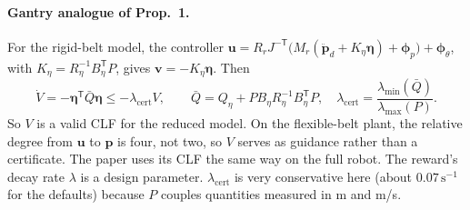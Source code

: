 \paragraph{Gantry analogue of Prop.~1.}
For the rigid-belt model, the controller
$\mathbf{u} = R_r J^{-\mathsf T}\bigl(M_r(\ddot{\mathbf{p}}_d + K_\eta \boldsymbol{\eta}) + \boldsymbol{\phi}_p\bigr) + \boldsymbol{\phi}_\theta$,
with $K_\eta = R_\eta^{-1} B_\eta^{\mathsf T} P$, gives $\mathbf{v} = -K_\eta \boldsymbol{\eta}$. Then
\begin{equation}
\dot V = -\boldsymbol{\eta}^{\mathsf T} \bar{Q} \boldsymbol{\eta}
\le -\lambda_{\mathrm{cert}} V, \qquad
\bar{Q} = Q_\eta + P B_\eta R_\eta^{-1} B_\eta^{\mathsf T} P, \quad
\lambda_{\mathrm{cert}} = \frac{\lambda_{\min}(\bar Q)}{\lambda_{\max}(P)}.
\end{equation}
So $V$ is a valid CLF for the reduced model.
On the flexible-belt plant, the relative degree from $\mathbf{u}$ to $\mathbf{p}$ is four, not two,
so $V$ serves as guidance rather than a certificate. The paper uses its CLF the same way on the full robot.
The reward's decay rate $\lambda$ is a design parameter. $\lambda_{\mathrm{cert}}$ is very conservative here
(about $0.07\,\mathrm{s^{-1}}$ for the defaults) because $P$ couples quantities measured in m and m/s.

